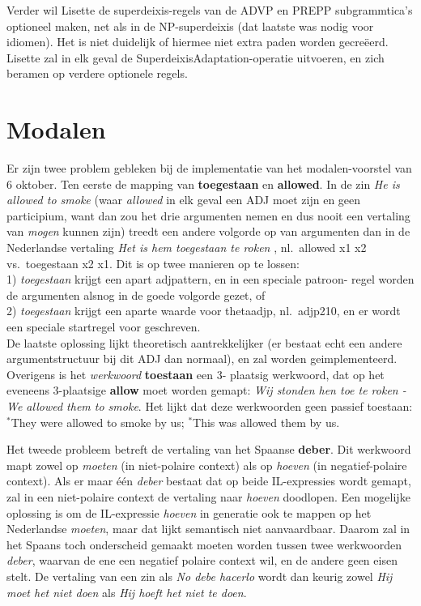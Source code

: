 Verder wil Lisette de superdeixis-regels van de ADVP en PREPP subgrammtica's 
optioneel maken, net als in de NP-superdeixis (dat laatste was nodig voor 
idiomen). Het is niet duidelijk of hiermee niet extra paden worden 
gecre\"{e}erd. Lisette zal in elk geval de SuperdeixisAdaptation-operatie 
uitvoeren, en zich beramen op verdere optionele regels.

\section{Modalen}
Er zijn twee problem gebleken bij de implementatie van het modalen-voorstel van 
6 oktober. Ten eerste de mapping van {\bf toegestaan} en {\bf allowed}. In de zin 
{\em He is allowed to smoke\/} (waar {\em allowed\/} in elk geval een ADJ moet 
zijn en geen participium, want dan zou het drie argumenten nemen en dus nooit 
een vertaling van {\em mogen\/} kunnen zijn) treedt een andere volgorde op van 
argumenten dan in de Nederlandse vertaling {\em Het is hem toegestaan te roken
\/}, nl.\ allowed x1 x2 vs.\ toegestaan x2 x1. Dit is op twee manieren op te 
lossen:\\
1) {\em toegestaan\/} krijgt een apart adjpattern, en in een speciale patroon- 
regel worden de argumenten alsnog in de goede volgorde gezet, of\\
2) {\em toegestaan\/} krijgt een aparte waarde voor thetaadjp, nl.\ adjp210, en 
er wordt een speciale startregel voor geschreven. \\
De laatste oplossing lijkt theoretisch aantrekkelijker (er bestaat echt een 
andere argumentstructuur bij dit ADJ dan normaal), en zal worden 
geimplementeerd. Overigens is het {\em werkwoord\/} {\bf toestaan} een 3-
plaatsig werkwoord, dat op het eveneens 3-plaatsige {\bf allow} moet worden 
gemapt: {\em Wij stonden hen toe te roken - We allowed them to smoke\/}. Het 
lijkt dat deze werkwoorden geen passief toestaan: $^{*}$They were allowed to 
smoke by us; $^{*}$This was allowed them by us.

Het tweede probleem betreft de vertaling van het Spaanse {\bf deber}. Dit 
werkwoord mapt zowel op {\em moeten\/} (in niet-polaire context) als op {\em
hoeven\/} (in negatief-polaire context). Als er maar \'{e}\'{e}n {\em deber\/} 
bestaat dat op beide IL-expressies wordt gemapt, zal in een niet-polaire 
context de vertaling naar {\em hoeven\/} doodlopen. Een mogelijke oplossing is 
om de 
IL-expressie {\em hoeven\/} in generatie ook te mappen op het Nederlandse {\em
moeten\/}, maar dat lijkt semantisch niet aanvaardbaar. Daarom zal in het Spaans 
toch onderscheid gemaakt moeten worden tussen twee werkwoorden {\em deber\/}, 
waarvan de ene een negatief polaire context wil, en de andere geen eisen stelt.
De vertaling van een zin als {\em No debe hacerlo\/} wordt dan keurig zowel 
{\em Hij moet het niet doen\/} als {\em Hij hoeft het niet te doen\/}.

